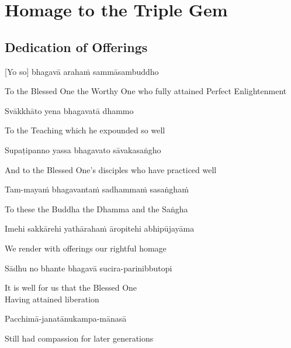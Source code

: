 
\chapter{Homage to the Triple Gem}

\section{Dedication of Offerings}

[Yo so] bhagavā arahaṁ sammāsambuddho

\begin{cprenglish}
  To the Blessed One the Worthy One who fully attained Perfect Enlightenment
\end{cprenglish}

Svākkhāto yena bhagavatā dhammo

\begin{cprenglish}
  To the Teaching which he expounded so well
\end{cprenglish}

Supaṭipanno yassa bhagavato sāvakasaṅgho

\begin{cprenglish}
  And to the Blessed One’s disciples who have practiced well
\end{cprenglish}

Tam-mayaṁ bhagavantaṁ sadhammaṁ sasaṅghaṁ

\begin{cprenglish}
  To these the Buddha the Dhamma and the Saṅgha
\end{cprenglish}

Imehi sakkārehi yathārahaṁ āropitehi abhipūjayāma

\begin{cprenglish}
  We render with offerings our rightful homage
\end{cprenglish}

Sādhu no bhante bhagavā sucira-parinibbutopi

\begin{cprenglish}
  It is well for us that the Blessed One\\
  Having attained liberation
\end{cprenglish}

Pacchimā-janatānukampa-mānasā

\begin{cprenglish}
  Still had compassion for later generations
\end{cprenglish}

